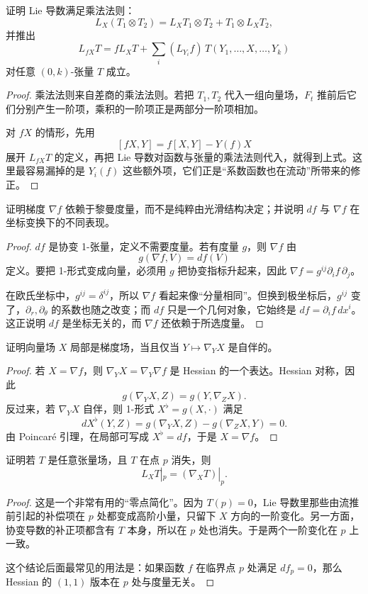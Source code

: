 \documentclass[11pt,a4paper,openany]{ctexbook}
\numberwithin{equation}{chapter}
\begin{document}
\begin{problem}
证明 Lie 导数满足乘法法则：
\[
L_X(T_1\otimes T_2)=L_XT_1\otimes T_2+T_1\otimes L_XT_2,
\]
并推出
\[
L_{fX}T=fL_XT+\sum_i (L_{Y_i}f)\,T(Y_1,\ldots,X,\ldots,Y_k)
\]
对任意 \((0,k)\)-张量 \(T\) 成立。
\end{problem}
\begin{proof}
乘法法则来自差商的乘法法则。若把 \(T_1,T_2\) 代入一组向量场，\(F_t\) 推前后它们分别产生一阶项，乘积的一阶项正是两部分一阶项相加。

对 \(fX\) 的情形，先用
\[
[fX,Y]=f[X,Y]-Y(f)X
\]
展开 \(L_{fX}T\) 的定义，再把 Lie 导数对函数与张量的乘法法则代入，就得到上式。这里最容易漏掉的是 \(Y_i(f)\) 这些额外项，它们正是“系数函数也在流动”所带来的修正。
\end{proof}

\begin{problem}
证明梯度 \( \nabla f\) 依赖于黎曼度量，而不是纯粹由光滑结构决定；并说明 \(df\) 与 \(\nabla f\) 在坐标变换下的不同表现。
\end{problem}
\begin{proof}
\(df\) 是协变 1-张量，定义不需要度量。若有度量 \(g\)，则 \(\nabla f\) 由
\[
g(\nabla f,V)=df(V)
\]
定义。要把 1-形式变成向量，必须用 \(g\) 把协变指标升起来，因此 \(\nabla f=g^{ij}\partial_i f\,\partial_j\)。

在欧氏坐标中，\(g^{ij}=\delta^{ij}\)，所以 \(\nabla f\) 看起来像“分量相同”。但换到极坐标后，\(g^{ij}\) 变了，\(\partial_r,\partial_\theta\) 的系数也随之改变；而 \(df\) 只是一个几何对象，它始终是 \(df=\partial_if\,dx^i\)。这正说明 \(df\) 是坐标无关的，而 \(\nabla f\) 还依赖于所选度量。
\end{proof}

\begin{problem}
证明向量场 \(X\) 局部是梯度场，当且仅当 \(Y\mapsto \nabla_YX\) 是自伴的。
\end{problem}
\begin{proof}
若 \(X=\nabla f\)，则 \(\nabla_YX=\nabla_Y\nabla f\) 是 Hessian 的一个表达。Hessian 对称，因此
\[
g(\nabla_YX,Z)=g(Y,\nabla_ZX).
\]
反过来，若 \(\nabla_YX\) 自伴，则 1-形式 \(X^\flat=g(X,\cdot)\) 满足
\[
dX^\flat(Y,Z)=g(\nabla_YX,Z)-g(\nabla_ZX,Y)=0.
\]
由 Poincaré 引理，在局部可写成 \(X^\flat=df\)，于是 \(X=\nabla f\)。
\end{proof}

\begin{problem}
证明若 \(T\) 是任意张量场，且 \(T\) 在点 \(p\) 消失，则
\[
L_XT|_p=(\nabla_XT)|_p.
\]
\end{problem}
\begin{proof}
这是一个非常有用的“零点简化”。因为 \(T(p)=0\)，Lie 导数里那些由流推前引起的补偿项在 \(p\) 处都变成高阶小量，只留下 \(X\) 方向的一阶变化。另一方面，协变导数的补正项都含有 \(T\) 本身，所以在 \(p\) 处也消失。于是两个一阶变化在 \(p\) 上一致。

这个结论后面最常见的用法是：如果函数 \(f\) 在临界点 \(p\) 处满足 \(df_p=0\)，那么 Hessian 的 \((1,1)\) 版本在 \(p\) 处与度量无关。
\end{proof}
\end{document}
